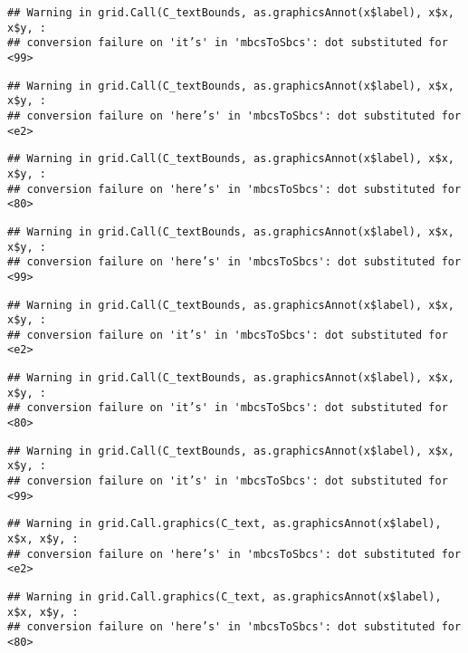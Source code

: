 \documentclass[
]{article}
\begin{document}
\begin{verbatim}
## Warning in grid.Call(C_textBounds, as.graphicsAnnot(x$label), x$x, x$y, :
## conversion failure on 'it’s' in 'mbcsToSbcs': dot substituted for <99>
\end{verbatim}

\begin{verbatim}
## Warning in grid.Call(C_textBounds, as.graphicsAnnot(x$label), x$x, x$y, :
## conversion failure on 'here’s' in 'mbcsToSbcs': dot substituted for <e2>
\end{verbatim}

\begin{verbatim}
## Warning in grid.Call(C_textBounds, as.graphicsAnnot(x$label), x$x, x$y, :
## conversion failure on 'here’s' in 'mbcsToSbcs': dot substituted for <80>
\end{verbatim}

\begin{verbatim}
## Warning in grid.Call(C_textBounds, as.graphicsAnnot(x$label), x$x, x$y, :
## conversion failure on 'here’s' in 'mbcsToSbcs': dot substituted for <99>
\end{verbatim}

\begin{verbatim}
## Warning in grid.Call(C_textBounds, as.graphicsAnnot(x$label), x$x, x$y, :
## conversion failure on 'it’s' in 'mbcsToSbcs': dot substituted for <e2>
\end{verbatim}

\begin{verbatim}
## Warning in grid.Call(C_textBounds, as.graphicsAnnot(x$label), x$x, x$y, :
## conversion failure on 'it’s' in 'mbcsToSbcs': dot substituted for <80>
\end{verbatim}

\begin{verbatim}
## Warning in grid.Call(C_textBounds, as.graphicsAnnot(x$label), x$x, x$y, :
## conversion failure on 'it’s' in 'mbcsToSbcs': dot substituted for <99>
\end{verbatim}

\begin{verbatim}
## Warning in grid.Call.graphics(C_text, as.graphicsAnnot(x$label), x$x, x$y, :
## conversion failure on 'here’s' in 'mbcsToSbcs': dot substituted for <e2>
\end{verbatim}

\begin{verbatim}
## Warning in grid.Call.graphics(C_text, as.graphicsAnnot(x$label), x$x, x$y, :
## conversion failure on 'here’s' in 'mbcsToSbcs': dot substituted for <80>
\end{verbatim}
\end{document}

